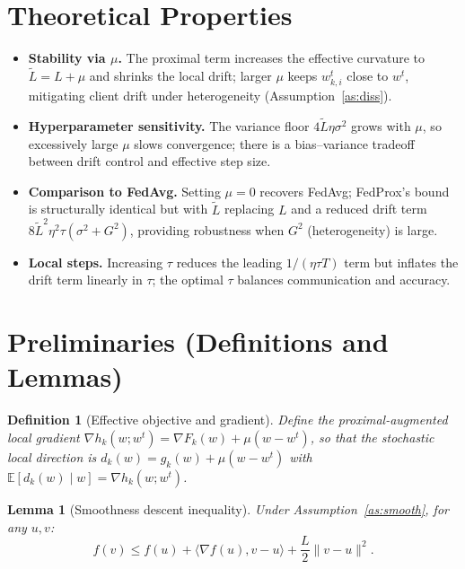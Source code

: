\documentclass{article}
\newtheorem{lemma}{Lemma}
\newtheorem{definition}{Definition}
\begin{document}
\section*{Theoretical Properties}

\begin{itemize}
\item \textbf{Stability via $\mu$.} The proximal term increases the effective curvature to $\tilde L = L + \mu$ and shrinks the local drift; larger $\mu$ keeps $w_{k,i}^t$ close to $w^t$, mitigating client drift under heterogeneity (Assumption~\ref{as:diss}).
\item \textbf{Hyperparameter sensitivity.} The variance floor $4\tilde L \eta \sigma^2$ grows with $\mu$, so excessively large $\mu$ slows convergence; there is a bias–variance tradeoff between drift control and effective step size.
\item \textbf{Comparison to FedAvg.} Setting $\mu = 0$ recovers FedAvg; FedProx's bound is structurally identical but with $\tilde L$ replacing $L$ and a reduced drift term $8\tilde L^2 \eta^2 \tau (\sigma^2 + G^2)$, providing robustness when $G^2$ (heterogeneity) is large.
\item \textbf{Local steps.} Increasing $\tau$ reduces the leading $1/(\eta\tau T)$ term but inflates the drift term linearly in $\tau$; the optimal $\tau$ balances communication and accuracy.
\end{itemize}

\section*{Preliminaries (Definitions and Lemmas)}

\begin{definition}[Effective objective and gradient]
Define the proximal-augmented local gradient
$\nabla h_k(w; w^t) = \nabla F_k(w) + \mu (w - w^t)$, so that the stochastic local direction is
$d_k(w) = g_k(w) + \mu(w - w^t)$ with $\mathbb{E}[d_k(w)\mid w] = \nabla h_k(w;w^t)$.
\end{definition}

\begin{lemma}[Smoothness descent inequality]\label{lem:descent}
Under Assumption~\ref{as:smooth}, for any $u, v$:
\[
f(v) \le f(u) + \langle \nabla f(u), v-u\rangle + \frac{L}{2}\|v - u\|^2 .
\]
\end{lemma}
\end{document}
